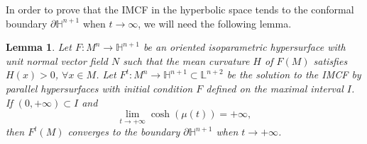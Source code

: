 \documentclass[11pt,a4paper,reqno]{amsproc}
\numberwithin{equation}{section}
\newtheorem{lemma}[theorem]{\bf Lemma}
\begin{document}
In order to prove that the IMCF in the hyperbolic space tends to the conformal boundary 
$\partial\mathbb{H}^{n+1}$ when  $t\rightarrow \infty$, we will need 
 the following lemma.

\begin{lemma}\label{res.23}
Let $F:M^{n} \longrightarrow \mathbb{H}^{n+1}$ be an oriented isoparametric hypersurface with  unit normal vector field $N$ such that the mean curvature $H$ of $F(M)$ satisfies $H(x)>0$, $\forall x \in M$. Let ${F}^t:M^{n}  \longrightarrow \mathbb{H}^{n+1} \subset \mathbb{L}^{n+2}$ be the solution to the IMCF by parallel hypersurfaces with initial condition $F$ defined on the maximal interval $I$. If $(0,+\infty) \subset I$ and 
$$
\lim\limits_{t \longrightarrow +\infty}\cosh(\mu(t))=+\infty,
$$ 
then ${F}^{t}(M)$ converges to the boundary $\partial\mathbb{H}^{n+1}$ when $t \longrightarrow +\infty$.
\end{lemma}
\end{document}
